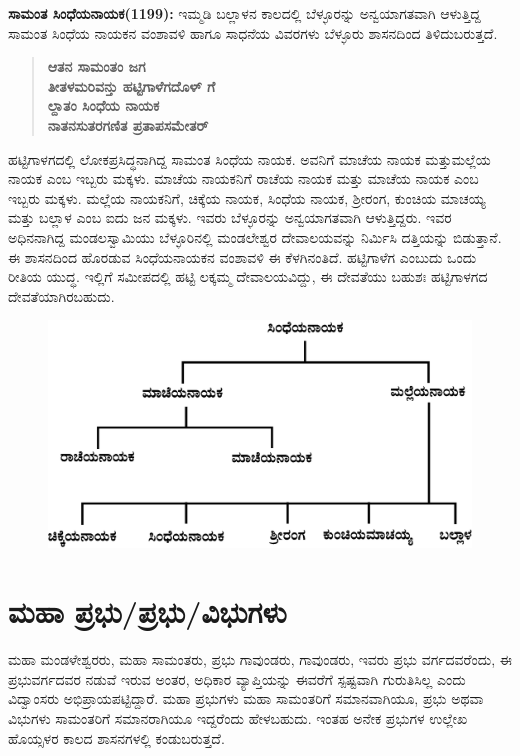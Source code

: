 \textbf{ಸಾಮಂತ ಸಿಂಧೆಯನಾಯಕ(1199):} ಇಮ್ಮಡಿ ಬಲ್ಲಾಳನ ಕಾಲದಲ್ಲಿ ಬೆಳ್ಳೂರನ್ನು ಅನ್ವಯಾಗತವಾಗಿ ಆಳುತ್ತಿದ್ದ ಸಾಮಂತ ಸಿಂಧೆಯ ನಾಯಕನ ವಂಶಾವಳಿ ಹಾಗೂ ಸಾಧನೆಯ ವಿವರಗಳು ಬೆಳ್ಳೂರು ಶಾಸನದಿಂದ ತಿಳಿದುಬರುತ್ತದೆ.

\begin{verse}
\textbf{ಆತನ ಸಾಮಂತಂ ಜಗ} \\\textbf{ತೀತಳಮರಿವನ್ತು ಹಟ್ಟಿಗಾಳೆಗದೊಳ್​ ಗೆ} \\\textbf{ಲ್ದಾತಂ ಸಿಂಧೆಯ ನಾಯಕ } \\\textbf{ನಾತನಸುತರಗಣಿತ ಪ್ರತಾಪಸಮೇತರ್​ }
\end{verse}

ಹಟ್ಟಿಗಾಳಗದಲ್ಲಿ ಲೋಕಪ್ರಸಿದ್ಧನಾಗಿದ್ದ ಸಾಮಂತ ಸಿಂಧೆಯ ನಾಯಕ. ಅವನಿಗೆ ಮಾಚೆಯ ನಾಯಕ ಮತ್ತು\break ಮಲ್ಲೆಯ ನಾಯಕ ಎಂಬ ಇಬ್ಬರು ಮಕ್ಕಳು. ಮಾಚೆಯ ನಾಯಕನಿಗೆ ರಾಚೆಯ ನಾಯಕ ಮತ್ತು ಮಾಚೆಯ ನಾಯಕ ಎಂಬ ಇಬ್ಬರು ಮಕ್ಕಳು. ಮಲ್ಲೆಯ ನಾಯಕನಿಗೆ, ಚಿಕ್ಕೆಯ ನಾಯಕ, ಸಿಂಧೆಯ ನಾಯಕ, ಶ‍್ರೀರಂಗ, ಕುಂಚಿಯ ಮಾಚಯ್ಯ ಮತ್ತು ಬಲ್ಲಾಳ ಎಂಬ ಐದು ಜನ ಮಕ್ಕಳು. ಇವರು ಬೆಳ್ಳೂರನ್ನು ಅನ್ವಯಾಗತವಾಗಿ ಆಳುತ್ತಿದ್ದರು. ಇವರ ಅಧಿನನಾಗಿದ್ದ ಮಂಡಲಸ್ವಾಮಿಯು ಬೆಳ್ಳೂರಿನಲ್ಲಿ ಮಂಡಲೇಶ್ವರ ದೇವಾಲಯವನ್ನು ನಿರ್ಮಿಸಿ ದತ್ತಿಯನ್ನು ಬಿಡುತ್ತಾನೆ. ಈ ಶಾಸನದಿಂದ ಹೊರಡುವ ಸಿಂಧೆಯನಾಯಕನ ವಂಶಾವಳಿ ಈ ಕೆಳಗಿನಂತಿದೆ. ಹಟ್ಟಿಗಾಳೆಗ ಎಂಬುದು ಒಂದು ರೀತಿಯ ಯುದ್ಧ. ಇಲ್ಲಿಗೆ ಸಮೀಪದಲ್ಲಿ ಹಟ್ಟಿ ಲಕ್ಕಮ್ಮ ದೇವಾಲಯವಿದ್ದು, ಈ ದೇವತೆಯು ಬಹುಶಃ ಹಟ್ಟಿಗಾಳಗದ ದೇವತೆಯಾಗಿರಬಹುದು.

\newpage

\begin{figure}[H]
\includegraphics[scale=1.25]{images/chap3/chap3fig9.jpeg}
\end{figure}


\section{ಮಹಾ ಪ್ರಭು/ಪ್ರಭು/ವಿಭುಗಳು}

ಮಹಾ ಮಂಡಳೇಶ್ವರರು, ಮಹಾ ಸಾಮಂತರು, ಪ್ರಭು ಗಾವುಂಡರು, ಗಾವುಂಡರು, ಇವರು ಪ್ರಭು ವರ್ಗದವರೆಂದು, ಈ ಪ್ರಭುವರ್ಗದವರ ನಡುವೆ ಇರುವ ಅಂತರ, ಅಧಿಕಾರ ವ್ಯಾಪ್ತಿಯನ್ನು ಈವರೆಗೆ ಸ್ಪಷ್ಟವಾಗಿ ಗುರುತಿಸಿಲ್ಲ ಎಂದು ವಿದ್ವಾಂಸರು ಅಭಿಪ್ರಾಯಪಟ್ಟಿದ್ದಾರೆ. ಮಹಾ ಪ್ರಭುಗಳು ಮಹಾ ಸಾಮಂತರಿಗೆ ಸಮಾನವಾಗಿಯೂ, ಪ್ರಭು ಅಥವಾ ವಿಭುಗಳು ಸಾಮಂತರಿಗೆ ಸಮಾನರಾಗಿಯೂ ಇದ್ದರೆಂದು ಹೇಳಬಹುದು. ಇಂತಹ ಅನೇಕ ಪ್ರಭುಗಳ ಉಲ್ಲೇಖ ಹೊಯ್ಸಳರ ಕಾಲದ ಶಾಸನಗಳಲ್ಲಿ ಕಂಡುಬರುತ್ತದೆ.

